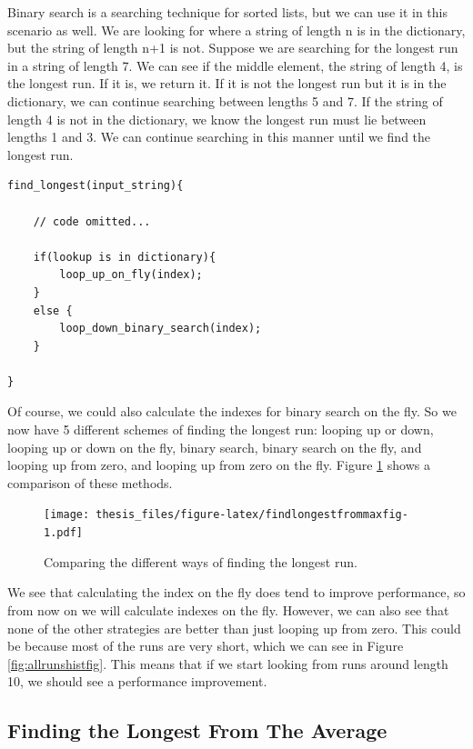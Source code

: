 \documentclass[12pt,twoside]{reedthesis}
\begin{document}
Binary search is a searching technique for sorted lists, but we can use it in this scenario as well. We are looking for where a string of length n is in the dictionary, but the string of length n+1 is not. Suppose we are searching for the longest run in a string of length 7. We can see if the middle element, the string of length 4, is the longest run. If it is, we return it. If it is not the longest run but it is in the dictionary, we can continue searching between lengths 5 and 7. If the string of length 4 is not in the dictionary, we know the longest run must lie between lengths 1 and 3. We can continue searching in this manner until we find the longest run.
\begin{verbatim}
find_longest(input_string){

    // code omitted...

    if(lookup is in dictionary){
        loop_up_on_fly(index);
    }
    else {
        loop_down_binary_search(index);
    }
    
}
\end{verbatim}
Of course, we could also calculate the indexes for binary search on the fly. So we now have 5 different schemes of finding the longest run: looping up or down, looping up or down on the fly, binary search, binary search on the fly, and looping up from zero, and looping up from zero on the fly. Figure \ref{fig:findlongestfrommaxfig} shows a comparison of these methods.
\begin{figure}
\centering
\texttt{[image: thesis\_files/figure-latex/findlongestfrommaxfig-1.pdf]}
\caption{\label{fig:findlongestfrommaxfig}Comparing the different ways of finding the longest run.}
\end{figure}
We see that calculating the index on the fly does tend to improve performance, so from now on we will calculate indexes on the fly. However, we can also see that none of the other strategies are better than just looping up from zero. This could be because most of the runs are very short, which we can see in Figure \ref{fig:allrunshistfig}. This means that if we start looking from runs around length 10, we should see a performance improvement.

\hypertarget{finding-the-longest-from-the-average}{%
\subsection{Finding the Longest From The Average}\label{finding-the-longest-from-the-average}}
\end{document}

